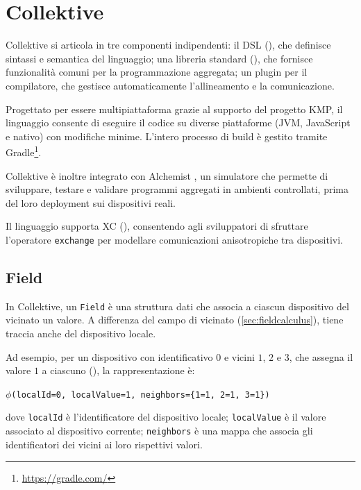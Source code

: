\chapter{Collektive}
\label{chap:collektive}
Collektive si articola in tre componenti indipendenti: il \ac{DSL} (), che definisce sintassi e semantica del linguaggio; una libreria standard (), che fornisce funzionalità comuni per la programmazione aggregata; un plugin per il compilatore, che gestisce automaticamente l'allineamento e la comunicazione.

Progettato per essere multipiattaforma grazie al supporto del progetto \ac{KMP}, il linguaggio consente di eseguire il codice su diverse piattaforme (JVM, JavaScript e nativo) con modifiche minime. L'intero processo di build è gestito tramite Gradle\footnote{\url{https://gradle.com/}}.

Collektive è inoltre integrato con Alchemist \cite{alchemist}, un simulatore che permette di sviluppare, testare e validare programmi aggregati in ambienti controllati, prima del loro deployment sui dispositivi reali.

Il linguaggio supporta \ac{XC} (), consentendo agli sviluppatori di sfruttare l'operatore \texttt{exchange} per modellare comunicazioni anisotropiche tra dispositivi.

\newpage
\section{Field}
\label{sec:collektivefields}

In Collektive, un \texttt{Field} è una struttura dati che associa a ciascun dispositivo del vicinato un valore.
%
A differenza del campo di vicinato (\cref{sec:fieldcalculus}), tiene traccia anche del dispositivo locale.

Ad esempio, per un dispositivo con identificativo \(0\) e vicini \(1\), \(2\) e \(3\), che assegna il valore \(1\) a ciascuno (), la rappresentazione è:

\begin{center}
\texttt{\(\phi\)(localId=0, localValue=1, neighbors=\{1=1, 2=1, 3=1\})}
\end{center}
dove \texttt{localId} è l’identificatore del dispositivo locale; \texttt{localValue} è il valore associato al dispositivo corrente; \texttt{neighbors} è una mappa che associa gli identificatori dei vicini ai loro rispettivi valori.

